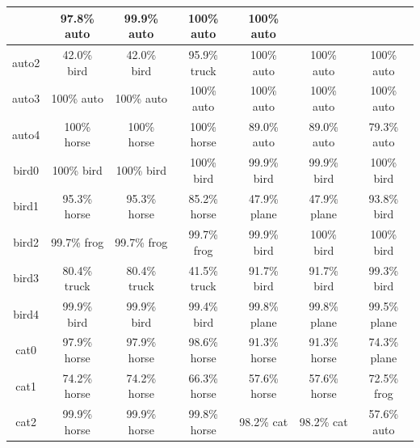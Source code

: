 \begin{longtable}{| c | c | c | c | c | c | c |}
& 97.8\% auto\cellcolor{green} 	
&  99.9\% auto\cellcolor{green} 	
& 100\% auto\cellcolor{green} 	
& 100\% auto\cellcolor{green}\\
 \hline
auto2\cellcolor{light-gray} 	
& 42.0\% bird		
& 42.0\% bird 	
& 95.9\% truck 	
&  100\% auto\cellcolor{green}  	
& 100\% auto\cellcolor{green} 	
& 100\% auto\cellcolor{green}\\
 \hline
auto3\cellcolor{light-gray} 	
& 100\% auto\cellcolor{green}		
& 100\% auto\cellcolor{green} 	
& 100\% auto\cellcolor{green} 	
&  100\% auto\cellcolor{green}  	
& 100\% auto\cellcolor{green} 	
& 100\% auto\cellcolor{green}\\
 \hline
auto4\cellcolor{light-gray} 	
& 100\% horse		
& 100\% horse 	
& 100\% horse 	
&  89.0\% auto\cellcolor{green}  	
& 89.0\% auto\cellcolor{green} 	
& 79.3\% auto\cellcolor{green}\\
 \hline
bird0 	\cellcolor{light-gray}	
& 100\% bird\cellcolor{green}		
& 100\% bird\cellcolor{green} 	
& 100\% bird\cellcolor{green} 	
& 99.9\% bird\cellcolor{green}  	
& 99.9\% bird\cellcolor{green} 	
& 100\% bird\cellcolor{green}\\
 \hline
bird1 	\cellcolor{light-gray}	
& 95.3\% horse		
& 95.3\% horse 	
& 85.2\% horse 	
& 47.9\% plane
& 47.9\% plane
& 93.8\% bird\cellcolor{green}\\
 \hline
bird2 	\cellcolor{light-gray}	
& 99.7\% frog		
& 99.7\% frog 	
& 99.7\% frog 	
&  99.9\% bird\cellcolor{green} 	 
& 100\% bird\cellcolor{green} 	
& 100\% bird\cellcolor{green}\\
 \hline
bird3 	\cellcolor{light-gray}	
& 80.4\% truck		
& 80.4\% truck 	
& 41.5\% truck 	
&  91.7\% bird\cellcolor{green} 	 
& 91.7\% bird\cellcolor{green} 	
& 99.3\% bird\cellcolor{green}\\
 \hline
bird4 	\cellcolor{light-gray}	
& 99.9\% bird\cellcolor{green}		
& 99.9\% bird\cellcolor{green} 	
& 99.4\% bird\cellcolor{green} 	
&  99.8\% plane
& 99.8\% plane 
& 99.5\% plane\\
 \hline
cat0 	\cellcolor{light-gray}	
& 97.9\% horse		
& 97.9\% horse 	
& 98.6\% horse 	
&  91.3\% horse  
& 91.3\% horse 
& 74.3\% plane\\
 \hline
cat1 	\cellcolor{light-gray}	
& 74.2\% horse		
& 74.2\% horse 	
& 66.3\% horse 	
&  57.6\% horse	 
& 57.6\% horse 
& 72.5\% frog\\
 \hline
cat2 	\cellcolor{light-gray}	
& 99.9\% horse		
& 99.9\% horse 	
& 99.8\% horse 
&  98.2\% cat\cellcolor{green} 	 
& 98.2\% cat\cellcolor{green} 	
& 57.6\% auto\\

\end{longtable}
